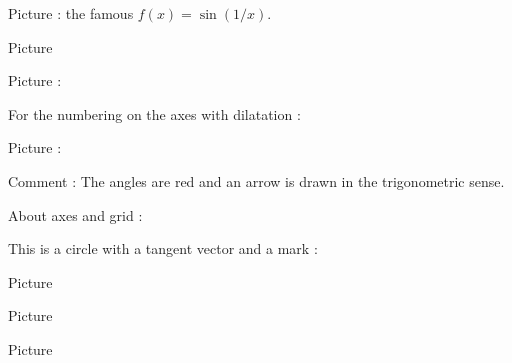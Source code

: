 \clearpage


Picture  : the famous \( f(x)=\sin(1/x)\).
\begin{center}
   
\end{center}
   

Picture 
\begin{center}
   
\end{center}
   

Picture : 
\begin{center}
   
\end{center}
   

For the numbering on the axes with dilatation : 
\begin{center}
   
\end{center}



Picture : 
\begin{center}
   
\end{center}
Comment : The angles are red and an arrow is drawn in the trigonometric sense.



About axes and grid : 
\begin{center}
   
\end{center}
   


This is a circle with a tangent vector and a mark :

\begin{center}
    
\end{center}



Picture 
\begin{center}
   
\end{center}

Picture 
\begin{center}
   
\end{center}


\clearpage


Picture 
\begin{center}
   
\end{center}
   


